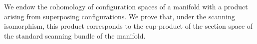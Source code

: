 We endow the cohomology of configuration spaces of a manifold with a product arising from superposing configurations. We prove that, under the scanning isomorphism, this product corresponds to the cup-product of the section space of the standard scanning bundle of the manifold.